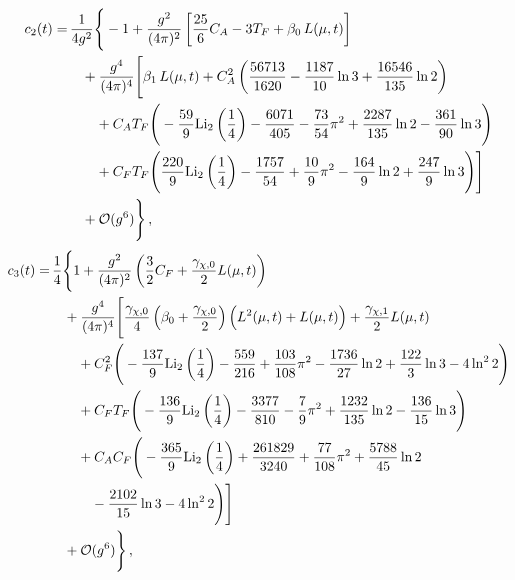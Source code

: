 \begin{equation}
	\begin{split}
          c_2(t) =& \, \frac{1}{4 g^2} \Bigg\{ - 1 +  \gcoup{2}
          \left[ \frac{25}{6}  C_A - 3  \TF + \beta _0 \,
      L (\mu, t) \right] \\
	& \quad +  \gcoup{4} \Bigg[ \beta _1 \, L (\mu, t) +
      C_A^2 \left(\frac{56713}{1620} - \frac{1187}{10} \ln 3 +
      \frac{16546}{135} \ln 2 \right) \\
	& \qquad + C_A  \TF \Bigg( - \frac{59}{9}
      \text{Li}_2\left(\frac{1}{4}\right) - \frac{6071}{405} -
      \frac{73}{54} \pi^2 + \frac{2287}{135} \ln 2 - \frac{361}{90} \ln
      3 \Bigg) \\
	& \qquad + C_F \TF \Bigg( \frac{220}{9}
      \text{Li}_2\left(\frac{1}{4}\right) - \frac{1757}{54} +
      \frac{10}{9} \pi ^2 - \frac{164}{9} \ln 2 + \frac{247}{9} \ln 3
      \Bigg) \Bigg] \\
	& \quad  + \order{g^6} \Bigg\} \, ,
    \label{eq:c2}
  \end{split}
\end{equation}
\begin{equation}
	\begin{split}
	  c_3 (t) =& \, \frac{1}{4} \Bigg\{1 + \gcoup{2}
          \left( \frac{3}{2} C_F +
          \frac{\gamma_{\chi, 0}}{2} L (\mu, t) \right) \\
			& \quad + \gcoup{4}
          \Bigg[ \frac{\gamma_{\chi, 0}}{4} \left(\beta _0+
            \frac{\gamma_{\chi, 0}}{2} \right) \Big( L^2 (\mu, t) + L
            (\mu, t) \Big) + \frac{\gamma_{\chi, 1}}{2} L (\mu, t) \\
			& \qquad + C_F^2 \Bigg( - \frac{137}{9}
            \text{Li}_2\left(\frac{1}{4}\right) - \frac{559}{216} +
            \frac{103}{108} \pi^2 - \frac{1736}{27} \ln 2 +
            \frac{122}{3} \ln 3 - 4 \ln^2 2 \Bigg) \\
			&  \qquad + C_F  \TF \Bigg( -
            \frac{136}{9}  \text{Li}_2\left(\frac{1}{4}\right) -
            \frac{3377}{810} - \frac{7}{9} \pi^2 + \frac{1232}{135} \ln
            2 - \frac{136}{15} \ln 3 \Bigg) \\
			& \qquad + C_A C_F \Bigg( - \frac{365}{9}
            \text{Li}_2 \left(\frac{1}{4}\right) + \frac{261829}{3240} +
            \frac{77}{108} \pi^2 + \frac{5788}{45} \ln 2 \\
			& \qquad \quad - \frac{2102}{15} \ln 3 - 4 \ln^2
            2 \Bigg) \Bigg] \\
			& \quad + \order{g^6} \Bigg\} \, ,
    \label{eq:c3}
	\end{split}
\end{equation}
